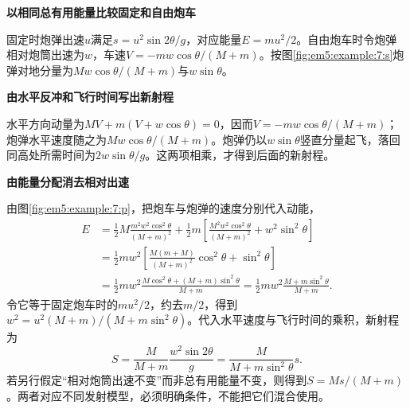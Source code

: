 \begin{solution}\textbf{以相同总有用能量比较固定和自由炮车}\par\nobreak
固定时炮弹出速$u$满足$s=u^2\sin2\theta/g$，对应能量$E=mu^2/2$。自由炮车时令炮弹相对炮筒出速为$w$，车速$V=-mw\cos\theta/(M+m)$。按图\ref{fig:em5:example:7:s}炮弹对地分量为$Mw\cos\theta/(M+m)$与$w\sin\theta$。



\par\medskip{}\noindent\textbf{由水平反冲和飞行时间写出新射程}\par\nobreak
水平方向动量为$MV+m(V+w\cos\theta)=0$，因而$V=-mw\cos\theta/(M+m)$；炮弹水平速度随之为$Mw\cos\theta/(M+m)$。炮弹仍以$w\sin\theta$竖直分量起飞，落回同高处所需时间为$2w\sin\theta/g$。这两项相乘，才得到后面的新射程。



\par\medskip{}\noindent\textbf{由能量分配消去相对出速}\par\nobreak
由图\ref{fig:em5:example:7:p}，把炮车与炮弹的速度分别代入动能，
\begin{align*}
E&=\frac12M\frac{m^2w^2\cos^2\theta}{(M+m)^2}
+\frac12m\left[\frac{M^2w^2\cos^2\theta}{(M+m)^2}+w^2\sin^2\theta\right]\\
&=\frac12mw^2\left[\frac{M(m+M)}{(M+m)^2}\cos^2\theta+\sin^2\theta\right]\\
&=\frac12mw^2\frac{M\cos^2\theta+(M+m)\sin^2\theta}{M+m}
=\frac12mw^2\frac{M+m\sin^2\theta}{M+m}.
\end{align*}
令它等于固定炮车时的$mu^2/2$，约去$m/2$，得到$w^2=u^2(M+m)/(M+m\sin^2\theta)$。代入水平速度与飞行时间的乘积，新射程为
\[S=\frac{M}{M+m}\frac{w^2\sin2\theta}{g}=\boxed{\frac{M}{M+m\sin^2\theta}s}.\]
若另行假定“相对炮筒出速不变”而非总有用能量不变，则得到$S=Ms/(M+m)$。两者对应不同发射模型，必须明确条件，不能把它们混合使用。\end{solution}
